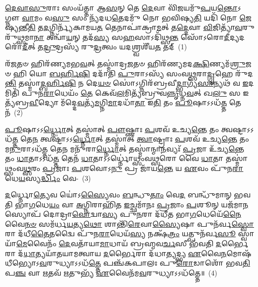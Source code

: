 {\anuvakamend[{\-\ul{𑌮}\-𑌘𑌵𑌾᳴𑌨𑌂 𑌮\-\ul{𑌨𑍍𑌦𑍇} 𑌹𑍍𑌯᳴\-\ul{𑌗𑍍𑌨𑍇} 𑌚𑌤𑍁᳴𑌰𑍍𑌦𑌶 𑌚}]}%

\setcounter{anuvakam}{0}
\-\ul{𑌦𑍇}\-\-\ul{𑌵𑌾}\-\-\ul{𑌸𑍁}\-𑌰𑌾𑌃 𑌸𑌂𑌯᳴𑌤𑍍𑌤𑌾 𑌆\-\ul{𑌸}\-𑌨𑍍 𑌤𑍇 \ul{𑌦𑍇}\-𑌵𑌾 𑌵𑌿᳴\-\ul{𑌜}\-𑌯𑌮𑍁᳴\-\ul{𑌪}\-𑌯\-\ul{𑌨𑍍𑌤𑍋}\-\-𑌽𑌗𑍍𑌨𑍗 \ul{𑌵𑌾}\-𑌮𑌂 𑌵\-\ul{𑌸𑍁} 𑌸𑌂 𑌨𑍍𑌯᳴𑌦𑌧\-\ul{𑌤𑍇}\-𑌦𑌮𑍁᳴ 𑌨𑍋 𑌭𑌵𑌿𑌷𑍍𑌯\-\ul{𑌤𑌿} 𑌯𑌦𑌿᳴ 𑌨𑍋 \ul{𑌜𑍇}\-𑌷𑍍𑌯𑌨𑍍𑌤𑍀\-\ul{𑌤𑌿} 𑌤\-\ul{𑌦}\-𑌗𑍍𑌨𑌿𑌰𑍍𑌨𑍍𑌯᳴𑌕𑌾𑌮𑌯\-\ul{𑌤} 𑌤𑍇𑌨𑌾𑌪𑌾॑𑌕𑍍𑌰𑌾\-\ul{𑌮}\-𑌤𑍍 𑌤\-\ul{𑌦𑍍𑌦𑍇}\-𑌵𑌾 \ul{𑌵𑌿}\-𑌜𑌿𑌤𑍍𑌯𑌾᳴\-\ul{𑌵}\-𑌰𑍁𑌰𑍁᳴𑌥𑍍𑌸𑌮𑌾\-\ul{𑌨𑌾} 𑌅𑌨𑍍𑌵𑌾᳴\-\ul{𑌯}\-𑌨𑍍 𑌤𑌦᳴\-\ul{𑌸𑍍𑌯} 𑌸\-\ul{𑌹}\-𑌸𑌾\-𑌽𑌦𑌿᳴𑌥𑍍𑌸\-\ul{𑌨𑍍𑌤} 𑌸𑍋᳴\-𑌽𑌰𑍋\-\ul{𑌦𑍀}\-𑌦𑍍𑌯𑌦𑌰𑍋᳴\-\ul{𑌦𑍀}\-𑌤𑍍 𑌤\-\ul{𑌦𑍍𑌰𑍁}\-𑌦𑍍𑌰𑌸𑍍𑌯᳴ 𑌰𑍁\-\ul{𑌦𑍍𑌰}\-𑌤𑍍𑌵𑌂 𑌯𑌦𑌶𑍍𑌰𑍍𑌵𑌶𑍀᳴𑌯\-\ul{𑌤} 𑌤𑌦𑍍~(1)

𑌰᳴\-\ul{𑌜}\-𑌤𑍞 𑌹𑌿𑌰᳴𑌣𑍍𑌯𑌮𑌭\-\ul{𑌵}\-𑌤𑍍 𑌤𑌸𑍍𑌮𑌾॑𑌦𑍍𑌰\-\ul{𑌜}\-𑌤𑍞 𑌹𑌿𑌰᳴𑌣𑍍𑌯𑌮𑌦\-\ul{𑌕𑍍𑌷𑌿}\-𑌣𑍍𑌯\-𑌮᳴\-\ul{𑌶𑍍𑌰𑍁}\-𑌜𑍞 𑌹𑌿 𑌯𑍋 \ul{𑌬}\-\-\ul{𑌰𑍍}\-\mbox{}𑌹𑌿\-\ul{𑌷𑌿} 𑌦𑌦𑌾᳴𑌤𑌿 \ul{𑌪𑍁}\-𑌰𑌾\-𑌽𑌸𑍍𑌯᳴ 𑌸𑌂𑌵\-\ul{𑌥𑍍𑌸}\-𑌰𑌾\-\ul{𑌦𑍍𑌗𑍃}\-𑌹𑍇 𑌰𑍁᳴𑌦\-\ul{𑌨𑍍𑌤𑌿} 𑌤𑌸𑍍𑌮𑌾॑\-\ul{𑌦𑍍𑌬}\-\-\ul{𑌰𑍍}\-\mbox{}𑌹𑌿\-\ul{𑌷𑌿} 𑌨 𑌦𑍇\-\ul{𑌯}\-\-\ul{𑍞} 𑌸𑍋॑\-𑌽𑌗𑍍𑌨𑌿𑌰᳴𑌬𑍍𑌰𑌵𑍀\-\ul{𑌦𑍍𑌭𑌾}\-𑌗𑍍𑌯᳴\-\ul{𑌸𑌾}\-𑌨𑍍𑌯𑌥᳴ 𑌵 \ul{𑌇}\-𑌦𑌮𑌿𑌤𑌿᳴ 𑌪𑍁𑌨\-\ul{𑌰𑌾}\-𑌧𑍇𑌯𑌂᳴ \ul{𑌤𑍇} 𑌕𑍇𑌵᳴\-\ul{𑌲}\-𑌮𑌿𑌤𑍍𑌯᳴𑌬𑍍𑌰𑍁𑌵\-\ul{𑌨𑍍𑌨𑍃}\-𑌧𑍍𑌨\-\ul{𑌵}\-𑌤𑍍 𑌖\-\ul{𑌲𑍁} 𑌸 𑌇𑌤𑍍𑌯᳴𑌬𑍍𑌰\-\ul{𑌵𑍀}\-𑌦𑍍𑌯𑍋 𑌮᳴𑌦𑍍𑌦𑍇\-\ul{𑌵}\-𑌤𑍍𑌯᳴\-\ul{𑌮}\-𑌗𑍍𑌨𑌿\-\ul{𑌮𑌾}\-𑌦𑌧𑌾᳴\-\ul{𑌤𑌾} 𑌇\-\ul{𑌤𑌿} 𑌤𑌂 \ul{𑌪𑍂}\-𑌷𑌾\-𑌽\-𑌽𑌧᳴\-\ul{𑌤𑍍𑌤} 𑌤𑍇𑌨᳴~(2)

\-\ul{𑌪𑍂}\-𑌷𑌾\-𑌽\-𑌽\-\ul{𑌰𑍍𑌧𑍍𑌨𑍋}\-𑌤𑍍 𑌤𑌸𑍍𑌮𑌾॑𑌤𑍍 \ul{𑌪𑍗}\-𑌷𑍍𑌣𑌾𑌃 \ul{𑌪}\-𑌶𑌵᳴ 𑌉𑌚𑍍𑌯\-\ul{𑌨𑍍𑌤𑍇} 𑌤𑌂 𑌤𑍍𑌵𑌷𑍍𑌟𑌾\-𑌽\-𑌽𑌧᳴\-\ul{𑌤𑍍𑌤} 𑌤𑍇\-\ul{𑌨} 𑌤𑍍𑌵𑌷𑍍𑌟𑌾॑\-𑌽\-𑌽\-\ul{𑌰𑍍𑌧𑍍𑌨𑍋}\-𑌤𑍍 𑌤𑌸𑍍𑌮𑌾॑𑌤𑍍 \ul{𑌤𑍍𑌵𑌾}\-𑌷𑍍𑌟𑍍𑌰𑌾𑌃 \ul{𑌪}\-𑌶𑌵᳴ 𑌉𑌚𑍍𑌯\-\ul{𑌨𑍍𑌤𑍇} 𑌤𑌂 𑌮\-\ul{𑌨𑍁}\-𑌰𑌾\-𑌽𑌧᳴\-\ul{𑌤𑍍𑌤} 𑌤𑍇\-\ul{𑌨} 𑌮𑌨𑍁᳴𑌰𑌾\-\ul{𑌰𑍍𑌧𑍍𑌨𑍋}\-𑌤𑍍 𑌤𑌸𑍍𑌮𑌾॑𑌨𑍍𑌮𑌾\-\ul{𑌨}\-𑌵𑍍𑌯𑌃᳴ \ul{𑌪𑍍𑌰}\-𑌜𑌾 𑌉᳴𑌚𑍍𑌯\-\ul{𑌨𑍍𑌤𑍇} 𑌤𑌂 \ul{𑌧𑌾}\-𑌤𑌾\-𑌽\-𑌽𑌧᳴\-\ul{𑌤𑍍𑌤} 𑌤𑍇𑌨᳴ \ul{𑌧𑌾}\-𑌤𑌾\-𑌽\-𑌽𑌰𑍍𑌧𑍍𑌨𑍋॑𑌥𑍍𑌸𑌂𑌵\-\ul{𑌥𑍍𑌸}\-𑌰𑍋 𑌵𑍈 \ul{𑌧𑌾}\-𑌤𑌾 𑌤𑌸𑍍𑌮𑌾॑𑌥𑍍𑌸𑌂𑌵\-\ul{𑌥𑍍𑌸}\-𑌰𑌂 \ul{𑌪𑍍𑌰}\-𑌜𑌾𑌃 \ul{𑌪}\-𑌶𑌵𑍋\-𑌽\-\ul{𑌨𑍁} 𑌪𑍍𑌰 𑌜𑌾᳴𑌯\-\ul{𑌨𑍍𑌤𑍇} 𑌯 \ul{𑌏}\-𑌵𑌂 𑌪𑍁᳴𑌨\-\ul{𑌰𑌾}\-𑌧𑍇\-\ul{𑌯}\-𑌸𑍍𑌯\-\ul{𑌰𑍍𑌦𑍍𑌧𑌿𑌂} 𑌵𑍇-~(3)

\-\ul{𑌦}\-𑌰𑍍𑌧𑍍𑌨𑍋\-\ul{𑌤𑍍𑌯𑍇}\-𑌵 𑌯𑍋॑\-𑌽\-\ul{𑌸𑍍𑌯𑍈}\-𑌵𑌂 \ul{𑌬}\-𑌨𑍍𑌧𑍁\-\ul{𑌤𑌾𑌂} 𑌵𑍇\-\ul{𑌦} 𑌬𑌨𑍍𑌧𑍁᳴𑌮𑌾𑌨𑍍 𑌭𑌵𑌤𑌿 𑌭𑌾\-\ul{𑌗}\-𑌧𑍇\-\ul{𑌯𑌂} 𑌵𑌾 \ul{𑌅}\-𑌗𑍍𑌨𑌿𑌰𑌾𑌹𑌿᳴𑌤 \ul{𑌇}\-𑌚𑍍𑌛𑌮𑌾᳴𑌨𑌃 \ul{𑌪𑍍𑌰}\-𑌜𑌾𑌂 \ul{𑌪}\-𑌶𑍂𑌨𑍍 𑌯𑌜᳴𑌮𑌾\-\ul{𑌨}\-𑌸𑍍𑌯𑍋𑌪᳴ 𑌦𑍋𑌦𑍍𑌰𑌾\-\ul{𑌵𑍋}\-𑌦𑍍𑌵𑌾\-\ul{𑌸𑍍𑌯} 𑌪𑍁\-\ul{𑌨}\-𑌰𑌾 𑌦᳴𑌧𑍀𑌤 𑌭𑌾\-\ul{𑌗}\-𑌧𑍇𑌯𑍇᳴\-\ul{𑌨𑍈}\-𑌵𑍈\-\ul{𑌨}\-\-\ul{𑍞} 𑌸𑌮᳴𑌰𑍍𑌧\-\ul{𑌯}\-𑌤𑍍𑌯\-\ul{𑌥𑍋} 𑌶𑌾𑌨𑍍𑌤𑌿᳴\-\ul{𑌰𑍇}\-𑌵𑌾\-\ul{𑌸𑍍𑌯𑍈}\-𑌷𑌾 𑌪𑍁𑌨᳴𑌰𑍍𑌵\-\ul{𑌸𑍍𑌵𑍋}\-𑌰𑌾 𑌦᳴𑌧𑍀\-\ul{𑌤𑍈}\-𑌤𑌦𑍍𑌵𑍈 𑌪𑍁᳴𑌨\-\ul{𑌰𑌾}\-𑌧𑍇𑌯᳴\-\ul{𑌸𑍍𑌯} 𑌨𑌕𑍍𑌷᳴\-\ul{𑌤𑍍𑌰𑌂} 𑌯𑌤𑍍𑌪𑍁𑌨᳴𑌰𑍍𑌵\-\ul{𑌸𑍂} 𑌸𑍍𑌵𑌾𑌯𑌾᳴\-\ul{𑌮𑍇}\-𑌵𑍈𑌨𑌂᳴ \ul{𑌦𑍇}\-𑌵𑌤𑌾᳴𑌯𑌾\-\ul{𑌮𑌾}\-𑌧𑌾𑌯᳴ 𑌬𑍍𑌰𑌹𑍍𑌮𑌵\-\ul{𑌰𑍍𑌚}\-𑌸𑍀 𑌭᳴𑌵𑌤𑌿 \ul{𑌦}\-𑌰𑍍𑌭𑍈𑌰𑌾 𑌦᳴\-\ul{𑌧𑌾}\-𑌤𑍍𑌯𑌯𑌾᳴𑌤𑌯𑌾𑌮𑌤𑍍𑌵𑌾𑌯 \ul{𑌦}\-𑌰𑍍𑌭𑍈𑌰𑌾 𑌦᳴𑌧𑌾\-\ul{𑌤𑍍𑌯}\-𑌦𑍍𑌭𑍍𑌯 \ul{𑌏}\-𑌵𑍈\-\ul{𑌨}\-𑌮𑍋𑌷᳴𑌧𑍀𑌭𑍍𑌯𑍋\-𑌽\-\ul{𑌵}\-𑌰𑍁𑌧𑍍𑌯𑌾\-𑌽\-𑌽𑌧᳴\-\ul{𑌤𑍍𑌤𑍇} 𑌪𑌞𑍍𑌚᳴𑌕𑌪𑌾𑌲𑌃 𑌪𑍁\-\ul{𑌰𑍋}\-𑌡𑌾𑌶𑍋᳴ 𑌭𑌵\-\ul{𑌤𑌿} 𑌪\-\ul{𑌞𑍍𑌚} 𑌵𑌾 \ul{𑌋}\-𑌤𑌵᳴ \ul{𑌋}\-𑌤𑍁𑌭𑍍𑌯᳴ \ul{𑌏}\-𑌵𑍈𑌨᳴𑌮\-\ul{𑌵}\-𑌰𑍁𑌧𑍍𑌯𑌾\-𑌽\-𑌽𑌧᳴𑌤𑍍𑌤𑍇॥~(4)

